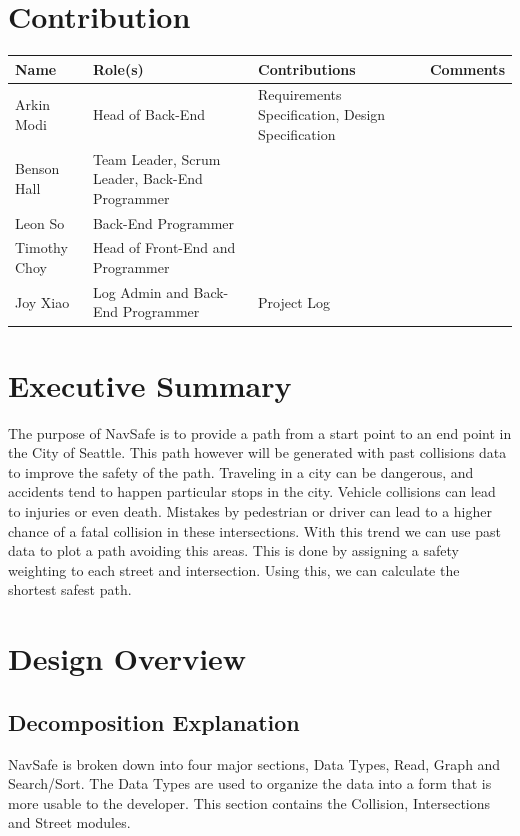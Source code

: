 \documentclass[12pt]{article}
\begin{document}
\section{Contribution}
\begin{tabular}{|P{2.5cm}|P{4cm}|P{5cm}|P{3.5cm}|}
    \hline
    \textbf{Name} & \textbf{Role(s)} & \textbf{Contributions} & \textbf{Comments}\\
    \hline
    Arkin Modi & Head of Back-End & Requirements Specification, Design Specification & ~\\
    \hline
    Benson Hall & Team Leader, Scrum Leader, Back-End Programmer & ~ & ~\\
    \hline
    Leon So & Back-End Programmer & ~ & ~\\
    \hline
    Timothy Choy & Head of Front-End and Programmer & ~ & ~\\
    \hline
    Joy Xiao & Log Admin and Back-End Programmer & Project Log & ~\\
    \hline
\end{tabular}
\newpage

\section{Executive Summary}
The purpose of NavSafe is to provide a path from a start point to an end point in the City of Seattle. This path however will be generated with past collisions data to improve the safety of the path. Traveling in a city can be dangerous, and accidents tend to happen particular stops in the city. Vehicle collisions can lead to injuries or even death. Mistakes by pedestrian or driver can lead to a higher chance of a fatal collision in these intersections. With this trend we can use past data to plot a path avoiding this areas. This is done by assigning a safety weighting to each street and intersection. Using this, we can calculate the shortest safest path.

\newpage

\tableofcontents
\newpage

\section{Design Overview}
    \subsection{Decomposition Explanation}
    NavSafe is broken down into four major sections, Data Types, Read, Graph and Search/Sort. The Data Types are used to organize the data into a form that is more usable to the developer. This section contains the Collision, Intersections and Street modules.\\
    
\end{document}
